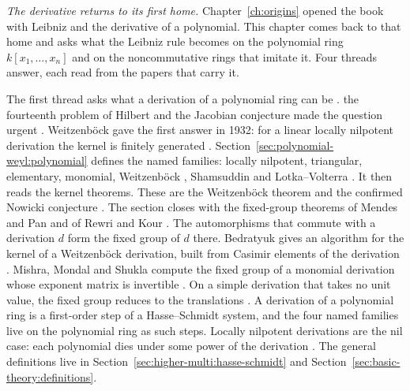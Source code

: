 \emph{The derivative returns to its first home.} Chapter~\ref{ch:origins}
opened the book with Leibniz and the derivative of a polynomial. This
chapter comes back to that home and asks what the Leibniz rule becomes on
the polynomial ring $k[x_{1},\dots,x_{n}]$ and on the noncommutative rings
that imitate it. Four threads answer, each read from the papers that carry
it.


The first thread asks what a derivation of a polynomial ring can be
\cite[p.~75]{Freudenburg2017}. the fourteenth problem of Hilbert and the
Jacobian conjecture made the question urgent
\cite[p.~xii]{Freudenburg2017}. Weitzenb\"ock gave the first answer in
1932: for a linear locally nilpotent derivation the kernel is finitely
generated \cite[p.~41]{DrenskyMakarLimanov2009}.
Section~\ref{sec:polynomial-weyl:polynomial} defines the named families:
locally nilpotent, triangular, elementary, monomial, Weitzenb\"ock
\cite[p.~76]{Freudenburg2017}, Shamsuddin \cite[p.~2033]{Baltazar2016} and
Lotka--Volterra \cite[p.~2]{RewriKour2025}. It then reads the kernel
theorems. These are the Weitzenb\"ock theorem and the confirmed Nowicki
conjecture \cite[Theorem~3, p.~44]{DrenskyMakarLimanov2009}. The section
closes with the fixed-group theorems of Mendes and Pan
\cite[Theorem~1, p.~2]{MendesPan2017} and of Rewri and Kour
\cite[Theorem~4.1, p.~21]{RewriKour2025}. The automorphisms that commute
with a derivation $d$ form the fixed group of $d$ there. Bedratyuk gives an
algorithm for the kernel of a Weitzenb\"ock derivation, built from Casimir
elements of the derivation \cite[p.~1]{Bedratyuk2005Casimir}.
Mishra, Mondal and Shukla compute the fixed group of a monomial derivation
whose exponent matrix is invertible \cite[Theorem~3.1,
p.~5]{MishraMondalShukla2026Monomial}. On a simple derivation that takes no
unit value, the fixed group reduces to the translations
\cite[Theorem~2.4, p.~5]{MishraMondalShukla2025Simple}. A derivation of a
polynomial ring is a first-order step of a Hasse--Schmidt system, and the
four named families live on the polynomial ring as such steps. Locally
nilpotent derivations are the nil case: each polynomial dies under some
power of the derivation \cite[p.~3]{Freudenburg2017}. The general
definitions live in
Section~\ref{sec:higher-multi:hasse-schmidt} and
Section~\ref{sec:basic-theory:definitions}.

